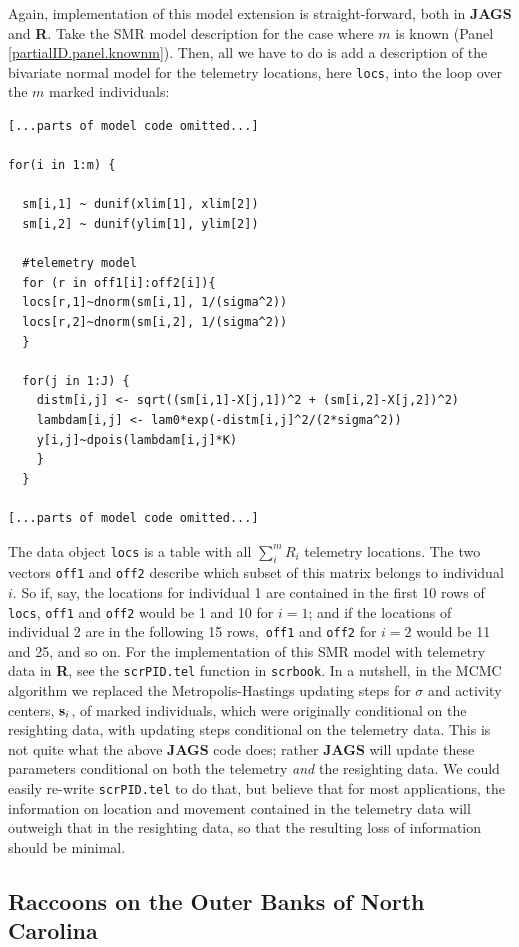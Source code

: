 Again, implementation of this model extension is straight-forward,
both in {\bf JAGS} and {\bf R}. Take the SMR model description for the
case where $m$ is known (Panel \ref{partialID.panel.knownm}). Then,
all we have to do is add a description of the bivariate normal model
for the telemetry locations, here {\tt locs}, into the loop over the
$m$ marked individuals:
{\small
\begin{verbatim}
[...parts of model code omitted...]

for(i in 1:m) {

  sm[i,1] ~ dunif(xlim[1], xlim[2])
  sm[i,2] ~ dunif(ylim[1], ylim[2])

  #telemetry model
  for (r in off1[i]:off2[i]){
  locs[r,1]~dnorm(sm[i,1], 1/(sigma^2))
  locs[r,2]~dnorm(sm[i,2], 1/(sigma^2))
  }

  for(j in 1:J) {
    distm[i,j] <- sqrt((sm[i,1]-X[j,1])^2 + (sm[i,2]-X[j,2])^2)
    lambdam[i,j] <- lam0*exp(-distm[i,j]^2/(2*sigma^2))
    y[i,j]~dpois(lambdam[i,j]*K)
    }
  }

[...parts of model code omitted...]
\end{verbatim}
}
The data object {\tt locs} is a table with all $\sum_i^m R_i$
telemetry locations. The two vectors {\tt off1} and {\tt off2}
describe which subset of this matrix belongs to individual $i$. So if,
say, the locations for individual 1 are contained in the first 10 rows
of {\tt locs}, {\tt off1} and {\tt off2} would be 1 and 10 for $i=1$;
and if the locations of individual 2 are in the following 15 rows,{\tt
  off1} and {\tt off2} for $i=2$ would be 11 and 25, and so on. For
the implementation of this SMR model with telemetry data in {\bf R},
see the {\tt scrPID.tel} function in {\tt scrbook}. In a nutshell, in
the MCMC algorithm we replaced the Metropolis-Hastings updating steps
for $\sigma$ and activity centers, ${\bf s}_i$, of marked individuals, which were originally
conditional on the resighting data, with updating steps conditional on
the telemetry data. This is not quite what the above {\bf JAGS} code
does; rather {\bf JAGS} will update these parameters conditional on
both the telemetry \emph{and} the resighting data. We could easily
re-write {\tt scrPID.tel} to do that, but believe that for most
applications, the information on location and movement contained in
the telemetry data will outweigh that in the resighting data, so that
the resulting loss of information should be minimal.

\subsection{Raccoons on the Outer Banks of North Carolina}

